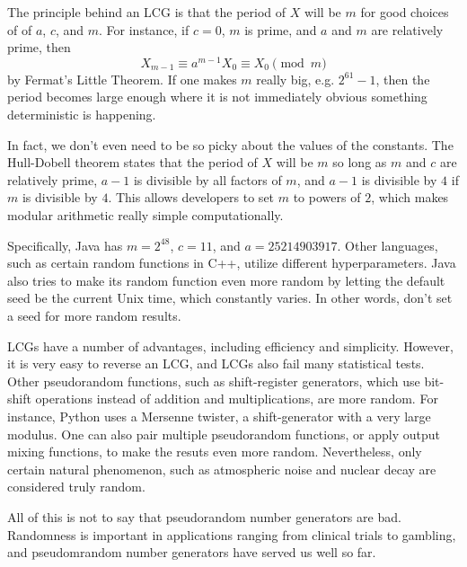 \documentclass{article}
\begin{document}
The principle behind an LCG is that the period of $X$ will be $m$ for good choices of of $a$, $c$, and $m$. For instance, if $c = 0$, $m$ is prime, and $a$ and $m$ are relatively prime, then \[X_{m-1}\equiv a^{m-1} X_0 \equiv X_0 \pmod{m}\] by Fermat's Little Theorem. If one makes $m$ really big, e.g. $2^{61}-1$, then the period becomes large enough where it is not immediately obvious something deterministic is happening. 

In fact, we don't even need to be so picky about the values of the constants. The Hull-Dobell theorem states that the period of $X$ will be $m$ so long as $m$ and $c$ are relatively prime, $a-1$ is divisible by all factors of $m$, and $a-1$ is divisible by $4$ if $m$ is divisible by $4$. This allows developers to set $m$ to powers of $2$, which makes modular arithmetic really simple computationally. 

Specifically, Java has $m = 2^{48}$, $c = 11$, and $a = 25214903917$. Other languages, such as certain random functions in C++, utilize different hyperparameters. Java also tries to make its random function even more random by letting the default seed be the current Unix time, which constantly varies. In other words, don't set a seed for more random results. 

LCGs have a number of advantages, including efficiency and simplicity. However, it is very easy to reverse an LCG, and LCGs also fail many statistical tests. Other pseudorandom functions, such as shift-register generators, which use bit-shift operations instead of addition and multiplications, are more random. For instance, Python uses a Mersenne twister, a shift-generator with a very large modulus. One can also pair multiple pseudorandom functions, or apply output mixing functions, to make the resuts even more random. Nevertheless, only certain natural phenomenon, such as atmospheric noise and nuclear decay are considered truly random. 

All of this is not to say that pseudorandom number generators are bad. Randomness is important in applications ranging from clinical trials to gambling, and pseudomrandom number generators have served us well so far.
\end{document}
